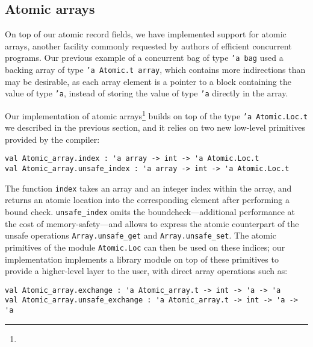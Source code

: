 \subsection{Atomic arrays}

On top of our atomic record fields, we have implemented support for atomic arrays, another facility commonly requested by authors of efficient concurrent programs.
Our previous example of a concurrent bag of type \texttt{'a bag} used a backing array of type \texttt{'a Atomic.t array}, which contains more indirections than may be desirable, as each array element is a pointer to a block containing the value of type \texttt{'a}, instead of storing the value of type \texttt{'a} directly in the array.

Our implementation of atomic arrays\footnote{} builds on top of the type \texttt{'a Atomic.Loc.t} we described in the previous section, and it relies on two new low-level primitives provided by the compiler:

\begin{verbatim}
val Atomic_array.index : 'a array -> int -> 'a Atomic.Loc.t
val Atomic_array.unsafe_index : 'a array -> int -> 'a Atomic.Loc.t
\end{verbatim}

The function \texttt{index} takes an array and an integer index within the array, and returns an atomic location into the corresponding element after performing a bound check.
\texttt{unsafe_index} omits the boundcheck---additional performance at the cost of memory-safety---and allows to express the atomic counterpart of the unsafe operations \texttt{Array.unsafe_get} and \texttt{Array.unsafe_set}.
The atomic primitives of the module \texttt{Atomic.Loc} can then be used on these indices; our implementation implements a library module on top of these primitives to provide a higher-level layer to the user, with direct array operations such as:

\begin{verbatim}
val Atomic_array.exchange : 'a Atomic_array.t -> int -> 'a -> 'a
val Atomic_array.unsafe_exchange : 'a Atomic_array.t -> int -> 'a -> 'a
\end{verbatim}
